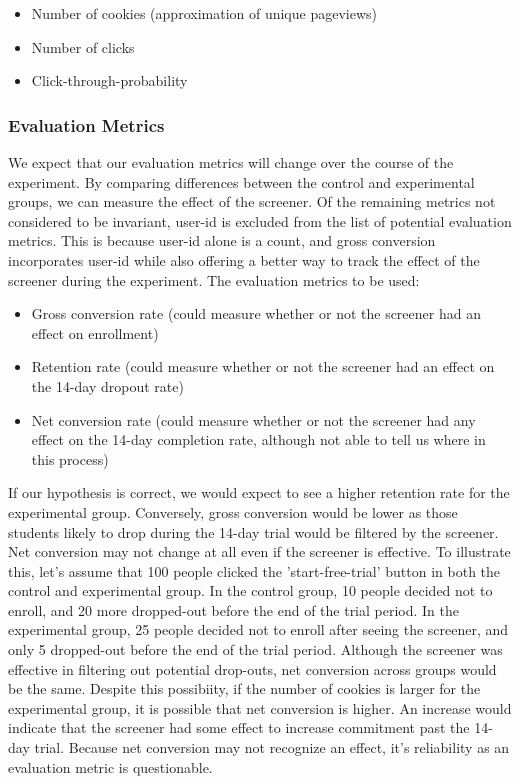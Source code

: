 \documentclass[paper=a4, fontsize=11pt]{scrartcl} %
\numberwithin{equation}{section} %
\numberwithin{figure}{section} %
\numberwithin{table}{section} %
\begin{document}
\begin{itemize}
	\item Number of cookies (approximation of unique pageviews)
	\item Number of clicks
	\item Click-through-probability
\end{itemize}


\subsubsection{Evaluation Metrics}

We expect that our evaluation metrics will change over the course of the experiment.  By comparing differences between the control and experimental groups, we can measure the effect of the screener.  Of the remaining metrics not considered to be invariant, user-id is excluded from the list of potential evaluation metrics.  This is because user-id alone is a count, and gross conversion incorporates user-id while also offering a better way to track the effect of the screener during the experiment.  The evaluation metrics to be used: 

\begin{itemize}
	\item Gross conversion rate (could measure whether or not the screener had an effect on enrollment)
	\item Retention rate (could measure whether or not the screener had an effect on the 14-day dropout rate)
	\item Net conversion rate (could measure whether or not the screener had any effect on the 14-day completion rate, although not able to tell us where in this process)
\end{itemize}

If our hypothesis is correct, we would expect to see a higher retention rate for the experimental group.  Conversely, gross conversion would be lower as those students likely to drop during the 14-day trial would be filtered by the screener.  Net conversion may not change at all even if the screener is effective.  To illustrate this, let's assume that 100 people clicked the 'start-free-trial' button in both the control and experimental group.  In the control group, 10 people decided not to enroll, and 20 more dropped-out before the end of the trial period.  In the experimental group, 25 people decided not to enroll after seeing the screener, and only 5 dropped-out before the end of the trial period.  Although the screener was effective in filtering out potential drop-outs, net conversion across groups would be the same.  Despite this possibiity, if the number of cookies is larger for the experimental group, it is possible that net conversion is higher.  An increase would indicate that the screener had some effect to increase commitment past the 14-day trial.  Because net conversion may not recognize an effect, it's reliability as an evaluation metric is questionable. \newline
\end{document}

